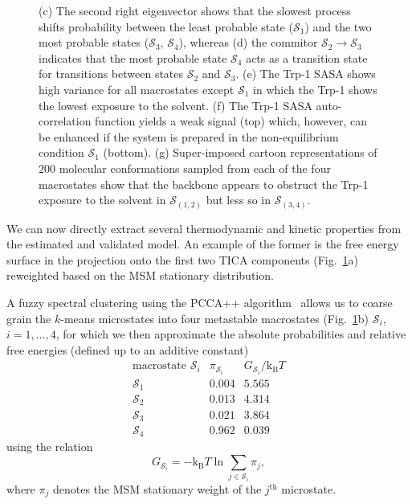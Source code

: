 \documentclass[9pt,tutorial]{livecoms}
\begin{document}
\begin{figure}
{(c) The second right eigenvector shows that the slowest process shifts probability between the least probable state ($\mathcal{S}_1$) and the two most probable states ($\mathcal{S}_3$, $\mathcal{S}_4$), whereas
(d) the commitor $\mathcal{S}_2\to\mathcal{S}_3$ indicates that the most probable state $\mathcal{S}_4$ acts as a transition state for transitions between states $\mathcal{S}_2$ and $\mathcal{S}_3$.
(e) The Trp-1 SASA shows high variance for all macrostates except $\mathcal{S}_1$ in which the Trp-1 shows the lowest exposure to the solvent.
(f) The Trp-1 SASA auto-correlation function yields a weak signal (top) which, however, can be enhanced if the system is prepared in the non-equilibrium condition $\mathcal{S}_1$ (bottom).
(g) Super-imposed cartoon representations of $200$ molecular conformations sampled from each of the four macrostates show that the backbone appears to obstruct the Trp-1 exposure to the solvent in $\mathcal{S}_{(1,2)}$ but less so in $\mathcal{S}_{(3,4)}$.}
\label{fig:msm-analysis}
\end{figure}

We can now directly extract several thermodynamic and kinetic properties from the estimated and validated model.
An example of the former is the free energy surface in the projection onto the first two TICA components (Fig.~\ref{fig:msm-analysis}a) reweighted based on the MSM stationary distribution.

A fuzzy spectral clustering using the PCCA++ algorithm~\cite{pcca++} allows us to coarse grain the $k$-means microstates into four metastable macrostates (Fig.~\ref{fig:msm-analysis}b) $\mathcal{S}_i$, $i=1,\dots,4$, for which we then approximate the absolute probabilities and relative free energies (defined up to an additive constant)
\[ \begin{array}{ccc}
\textrm{macrostate } \mathcal{S}_i & \pi_{\mathcal{S}_i} & G_{\mathcal{S}_i} / \textrm{k}_\textrm{B} T \\
\hline
\mathcal{S}_1 & 0.004 & 5.565 \\
\mathcal{S}_2 & 0.013 & 4.314 \\
\mathcal{S}_3 & 0.021 & 3.864 \\
\mathcal{S}_4 & 0.962 & 0.039
\end{array}\]
using the relation
\begin{equation}
\label{eq:fe}
G_{\mathcal{S}_i} = - \textrm{k}_\textrm{B} T \ln \sum\limits_{j\in \mathcal{S}_i} \pi_j,
\end{equation}
where $\pi_j$ denotes the MSM stationary weight of the $j^\textrm{th}$ microstate.
\end{document}
